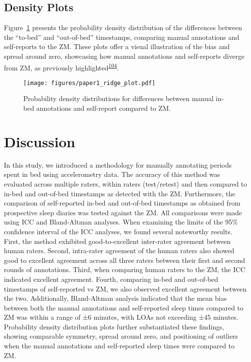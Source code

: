\documentclass[
  10pt,
]{scrbook}
\begin{document}
\hypertarget{density-plots}{%
\subsection{Density Plots}\label{density-plots}}

Figure~\ref{fig-ridge_plot} presents the probability density
distribution of the differences between the ``to-bed'' and
``out-of-bed'' timestamps, comparing manual annotations and self-reports
to the ZM. These plots offer a visual illustration of the bias and
spread around zero, showcasing how manual annotations and self-reports
diverge from ZM, as previously
highlighted\textsuperscript{\protect\hyperlink{ref-van_hees_estimating_2018}{104}}.

\begin{figure}

{\centering \texttt{[image: figures/paper1\_ridge\_plot.pdf]}

}

\caption{\label{fig-ridge_plot}Probability density distributions for
differences between manual in-bed annotations and self-report compared
to ZM.}

\end{figure}

\hypertarget{discussion}{%
\section{Discussion}\label{discussion}}

In this study, we introduced a methodology for manually annotating
periods spent in bed using accelerometry data. The accuracy of this
method was evaluated across multiple raters, within raters (test/retest)
and then compared to in-bed and out-of-bed timestamps as detected with
the ZM. Furthermore, the comparison of self-reported in-bed and
out-of-bed timestamps as obtained from prospective sleep diaries was
tested against the ZM. All comparisons were made using ICC and
Bland-Altman analyses. When examining the limits of the 95\% confidence
interval of the ICC analyses, we found several noteworthy results.
First, the method exhibited good-to-excellent inter-rater agreement
between human raters. Second, intra-rater agreement of the human raters
also showed good to excellent agreement across all three raters between
their first and second rounds of annotations. Third, when comparing
human raters to the ZM, the ICC indicated excellent agreement. Fourth,
comparing in-bed and out-of-bed timestamps of self-reported vs ZM, we
also observed excellent agreement between the two. Additionally,
Bland-Altman analysis indicated that the mean bias between both the
manual annotations and self-reported sleep times compared to ZM was
within a range of ±6 minutes, with LOAs not exceeding ±45 minutes.
Probability density distribution plots further substantiated these
findings, showing comparable symmetry, spread around zero, and
positioning of outliers when the manual annotations and self-reported
sleep times were compared to ZM.
\end{document}
